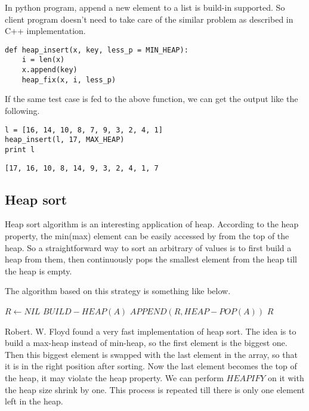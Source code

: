 \documentclass{article}
\begin{document}
In python program, append a new element to a list is build-in
supported. So client program doesn't need to take care of the
similar problem as described in C++ implementation.

\lstset{language=Python}
\begin{lstlisting}
def heap_insert(x, key, less_p = MIN_HEAP):
    i = len(x)
    x.append(key)
    heap_fix(x, i, less_p)
\end{lstlisting}

If the same test case is fed to the above function, we can
get the output like the following.

\begin{lstlisting}
l = [16, 14, 10, 8, 7, 9, 3, 2, 4, 1]
heap_insert(l, 17, MAX_HEAP)
print l
\end{lstlisting}

\begin{verbatim}
[17, 16, 10, 8, 14, 9, 3, 2, 4, 1, 7
\end{verbatim}

\subsection{Heap sort}
\label{heap-sort}

Heap sort algorithm is an interesting application of heap. According
to the heap property, the min(max) element can be easily accessed
by from the top of the heap. So a straightforward way to sort an
arbitrary of values is to first build a heap from them, then continuously
pops the smallest element from the heap till the heap is empty.

The algorithm based on this strategy is something like below.

\begin{algorithmic}[1]
  \State $R \gets NIL$
  \State $BUILD-HEAP(A)$
    \State $APPEND(R, HEAP-POP(A))$
  \EndWhile
  \State \Return $R$
\EndFunction
\end{algorithmic}

Robert. W. Floyd found a very fast implementation of heap sort.
The idea is to build a max-heap instead of min-heap, so the first
element is the biggest one. Then this biggest element is swapped
with the last element in the array, so that it is in the right
position after sorting. Now the last element becomes the top
of the heap, it may violate the heap property. We can perform
$HEAPIFY$ on it with the heap size shrink by one. This process
is repeated till there is only one element left in the heap.
\end{document}
